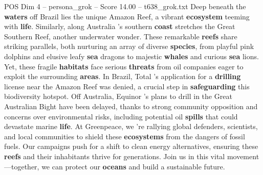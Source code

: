 \begin{textsample}{POS Dim 4 – persona\_grok – Score 14.00 – t638\_grok.txt}  \label{ex:f4_pos_039}
Deep beneath the \textbf{waters} off Brazil lies the unique Amazon Reef, a vibrant \textbf{ecosystem} teeming with \textbf{life}.
Similarly, along Australia 's southern \textbf{coast} stretches the Great Southern Reef, another underwater wonder.
These remarkable \textbf{reefs} share striking parallels, both nurturing an array of diverse \textbf{species}, from playful pink dolphins and elusive leafy \textbf{sea} dragons to majestic \textbf{whales} and curious \textbf{sea} lions.
Yet, these fragile \textbf{habitats} face serious \textbf{threats} from oil companies eager to exploit the surrounding \textbf{areas}.
In Brazil, Total 's application for a \textbf{drilling} license near the Amazon Reef was denied, a crucial step in \textbf{safeguarding} this biodiversity hotspot.
Off Australia, Equinor 's plans to drill in the Great Australian Bight have been delayed, thanks to strong community opposition and concerns over environmental risks, including potential oil \textbf{spills} that could devastate marine \textbf{life}.
At Greenpeace, we 're rallying global defenders, scientists, and local communities to shield these \textbf{ecosystems} from the dangers of fossil fuels.
Our campaigns push for a shift to clean energy alternatives, ensuring these \textbf{reefs} and their inhabitants thrive for generations.
Join us in this vital movement—together, we can protect our \textbf{oceans} and build a sustainable future.

\end{textsample}
